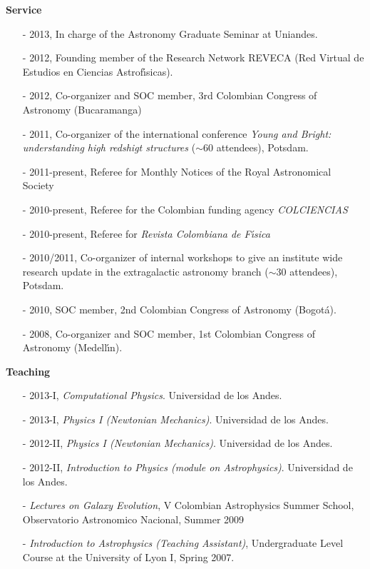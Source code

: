 \documentclass[9pt]{article}
\begin{document}
{\bf Service}
\begin{itemize}
\item[-] 2013, In charge of the Astronomy Graduate Seminar at Uniandes.
\item[-] 2012, Founding member of the Research Network REVECA (Red Virtual de Estudios en Ciencias Astrof\'{\i}sicas).
\item[-] 2012, Co-organizer and SOC member, 3rd Colombian Congress of Astronomy (Bucaramanga)
\item[-] 2011, Co-organizer of the international conference {\it Young and Bright: understanding high redshigt structures} ($\sim 60$ attendees), Potsdam.
\item[-] 2011-present, Referee for Monthly Notices of the Royal Astronomical Society %
\item[-] 2010-present, Referee for the Colombian funding agency {\it COLCIENCIAS} %
\item[-] 2010-present, Referee for {\it Revista Colombiana de F\'{\i}sica} %
\item[-] 2010/2011, Co-organizer of internal workshops to give an institute wide research update in the extragalactic astronomy branch ($\sim 30$ attendees), Potsdam.
\item[-] 2010, SOC member, 2nd Colombian Congress of Astronomy (Bogot\'a).
\item[-] 2008, Co-organizer and SOC member, 1st Colombian Congress of Astronomy (Medell\'{\i}n).
\end{itemize}

{\bf Teaching}
\begin{itemize}
\item[-] 2013-I, {\it Computational Physics}. Universidad de los Andes.
\item[-] 2013-I, {\it Physics I (Newtonian Mechanics)}. Universidad de los Andes.
\item[-] 2012-II, {\it Physics I (Newtonian Mechanics)}. Universidad de los Andes.
\item[-] 2012-II, {\it Introduction to Physics (module on Astrophysics)}. Universidad de los Andes.
\item[-]{\it Lectures on Galaxy Evolution}, V Colombian
  Astrophysics Summer School, Observatorio Astronomico Nacional, Summer 2009
\item[-]{\it{Introduction to Astrophysics (Teaching
      Assistant)}}, Undergraduate Level Course at the University of Lyon I,
      Spring 2007.
\end{itemize}
\end{document}
